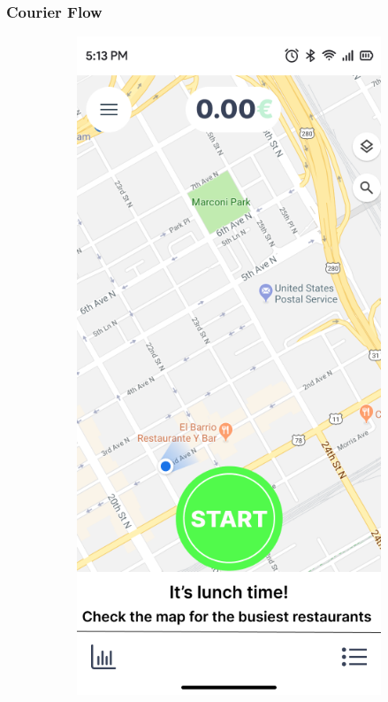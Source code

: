 \newpage

\subsubsection{Courier Flow}

\begin{figure}[h]
    \centering
    \begin{subfigure}[b]{0.48\textwidth}
        \centering
        \includegraphics[width=\textwidth]{images/go_screen.png}

\end{subfigure}
\end{figure}
